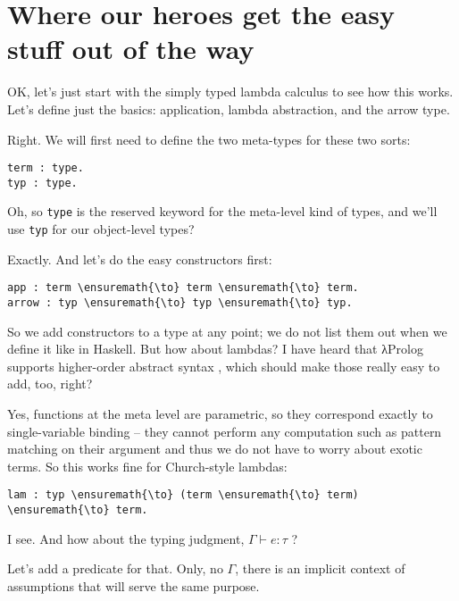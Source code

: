 \section{Where our heroes get the easy stuff out of the
way}\label{where-our-heroes-get-the-easy-stuff-out-of-the-way}

\heroSTUDENT{} OK, let's just start with the simply typed lambda calculus to
see how this works. Let's define just the basics: application, lambda
abstraction, and the arrow type.

\heroADVISOR{} Right. We will first need to define the two meta-types for
these two sorts:

\begin{verbatim}
term : type.
typ : type.
\end{verbatim}

\heroSTUDENT{} Oh, so \texttt{type} is the reserved keyword for the meta-level
kind of types, and we'll use \texttt{typ} for our object-level types?

\heroADVISOR{} Exactly. And let's do the easy constructors first:

\begin{verbatim}
app : term \ensuremath{\to} term \ensuremath{\to} term.
arrow : typ \ensuremath{\to} typ \ensuremath{\to} typ.
\end{verbatim}

\heroSTUDENT{} So we add constructors to a type at any point; we do not list
them out when we define it like in Haskell. But how about lambdas? I
have heard that \foreignlanguage{greek}{λ}Prolog supports higher-order abstract syntax
\citep{hoas-standard-reference}, which should make those really easy to
add, too, right?

\heroADVISOR{} Yes, functions at the meta level are parametric, so they
correspond exactly to single-variable binding -- they cannot perform any
computation such as pattern matching on their argument and thus we do
not have to worry about exotic terms. So this works fine for
Church-style lambdas:

\begin{verbatim}
lam : typ \ensuremath{\to} (term \ensuremath{\to} term) \ensuremath{\to} term.
\end{verbatim}

\heroSTUDENT{} I see. And how about the typing judgment,
\(\Gamma \vdash e : \tau\) ?

\heroADVISOR{} Let's add a predicate for that. Only, no \(\Gamma\), there is
an implicit context of assumptions that will serve the same purpose.

